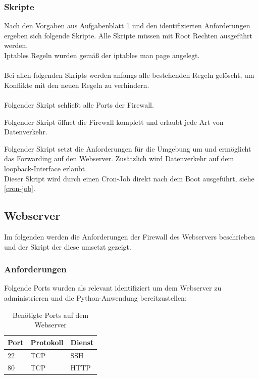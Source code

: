 \documentclass[
    a4paper,
    pagesize,
	pdftex,
    12pt,
]{scrartcl}
\begin{document}
\subsubsection{Skripte}
Nach den Vorgaben aus Aufgabenblatt 1 und den identifizierten Anforderungen ergeben sich folgende Skripte. Alle Skripte müssen mit  Root Rechten ausgeführt werden.\\
Iptables Regeln wurden gemäß der iptables man page \cite{iptables-manpage} angelegt. \\ \\ 
Bei allen folgenden Skripts werden anfangs alle bestehenden Regeln gelöscht, um Konflikte mit den neuen Regeln zu verhindern. \\ \\
Folgender Skript schließt alle Ports der Firewall.

Folgender Skript öffnet die Firewall komplett und erlaubt jede Art von Datenverkehr.

Folgender  Skript setzt die Anforderungen für die Umgebung um und ermöglicht das Forwarding auf den Webserver. Zusätzlich  wird  Datenverkehr auf dem  loopback-Interface erlaubt. \\
Dieser Skript wird durch einen Cron-Job direkt nach dem Boot ausgeführt, siehe  \ref{cron-job}.


\subsection{Webserver}\label{config-firewall-ws}
Im folgenden werden die Anforderungen der Firewall des Webservers beschrieben und der Skript der diese umsetzt gezeigt.

\subsubsection{Anforderungen}
Folgende Ports wurden als relevant identifiziert um dem Webserver zu administrieren und die Python-Anwendung bereitzustellen:
\begin{table}[h!]
	\begin{center}
		\label{tab:table4}
		\begin{tabular}{l|l |l }
			\textbf{Port} & \textbf{Protokoll} & \textbf{Dienst} \\
			\hline
			22 & TCP & SSH \\
			80 & TCP & HTTP \\
		\end{tabular}
		\caption{Benötigte Ports auf dem Webserver}
	\end{center}
\end{table}
\end{document}
